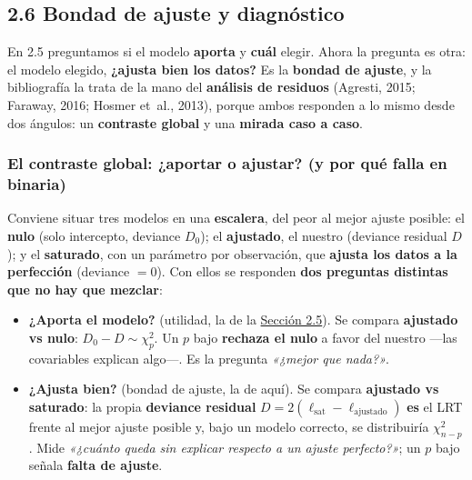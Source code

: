 \documentclass[
  letterpaper,
  DIV=11,
  numbers=noendperiod]{scrartcl}
\providecommand{\tightlist}{%
  \setlength{\itemsep}{0pt}\setlength{\parskip}{0pt}}\usepackage{longtable,booktabs,array}
\begin{document}
\hypertarget{sec-u12-diagnostico}{%
\subsection{2.6 Bondad de ajuste y
diagnóstico}\label{sec-u12-diagnostico}}

En 2.5 preguntamos si el modelo \textbf{aporta} y \textbf{cuál} elegir.
Ahora la pregunta es otra: el modelo elegido, \textbf{¿ajusta bien los
datos?} Es la \textbf{bondad de ajuste}, y la bibliografía la trata de
la mano del \textbf{análisis de residuos} (Agresti, 2015; Faraway, 2016;
Hosmer et~al., 2013), porque ambos responden a lo mismo desde dos
ángulos: un \textbf{contraste global} y una \textbf{mirada caso a caso}.

\hypertarget{el-contraste-global-aportar-o-ajustar-y-por-quuxe9-falla-en-binaria}{%
\subsubsection{El contraste global: ¿aportar o ajustar? (y por qué falla
en
binaria)}\label{el-contraste-global-aportar-o-ajustar-y-por-quuxe9-falla-en-binaria}}

Conviene situar tres modelos en una \textbf{escalera}, del peor al mejor
ajuste posible: el \textbf{nulo} (solo intercepto, deviance \(D_0\)); el
\textbf{ajustado}, el nuestro (deviance residual \(D\)); y el
\textbf{saturado}, con un parámetro por observación, que \textbf{ajusta
los datos a la perfección} (deviance \(=0\)). Con ellos se responden
\textbf{dos preguntas distintas que no hay que mezclar}:

\begin{itemize}
\tightlist
\item
  \textbf{¿Aporta el modelo?} (utilidad, la de la
  \protect\hyperlink{sec-u12-inferencia}{Sección 2.5}). Se compara
  \textbf{ajustado vs nulo}: \(D_0-D\sim\chi^2_{p}\). Un \(p\) bajo
  \textbf{rechaza el nulo} a favor del nuestro ---las covariables
  explican algo---. Es la pregunta \emph{«¿mejor que nada?»}.
\item
  \textbf{¿Ajusta bien?} (bondad de ajuste, la de aquí). Se compara
  \textbf{ajustado vs saturado}: la propia \textbf{deviance residual}
  \(D=2(\ell_{\text{sat}}-\ell_{\text{ajustado}})\) \textbf{es} el LRT
  frente al mejor ajuste posible y, bajo un modelo correcto, se
  distribuiría \(\chi^2_{n-p}\). Mide \emph{«¿cuánto queda sin explicar
  respecto a un ajuste perfecto?»}; un \(p\) bajo señala \textbf{falta
  de ajuste}.
\end{itemize}
\end{document}
